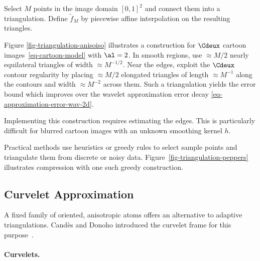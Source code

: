Select $M$ points in the image domain $[0,1]^2$ and connect them into a triangulation. Define $\tilde f_M$ by piecewise affine interpolation on the resulting triangles.


Figure \ref{fig-triangulation-anisoiso} illustrates a construction for $\Cdeux$ cartoon images~\eqref{eq-cartoon-model} with $\al=2$. In smooth regions, use $\approx M/2$ nearly equilateral triangles of width $\approx M^{-1/2}$. Near the edges, exploit the $\Cdeux$ contour regularity by placing $\approx M/2$ elongated triangles of length $\approx M^{-1}$ along the contours and width $\approx M^{-2}$ across them. Such a triangulation yields the error bound
which improves over the wavelet approximation error decay \eqref{eq-approximation-error-wav-2d}. 

Implementing this construction requires estimating the edges. This is particularly difficult for blurred cartoon images with an unknown smoothing kernel $h$.

Practical methods use heuristics or greedy rules to select sample points and triangulate them from discrete or noisy data.
Figure~\ref{fig-triangulation-peppers} illustrates compression with one such greedy construction.


                                        
\subsection{Curvelet Approximation}

A fixed family of oriented, anisotropic atoms offers an alternative to adaptive triangulations. Cand\`es and Donoho introduced the curvelet frame for this purpose~\cite{candes-tight-frame}.

  
\paragraph{Curvelets.}

